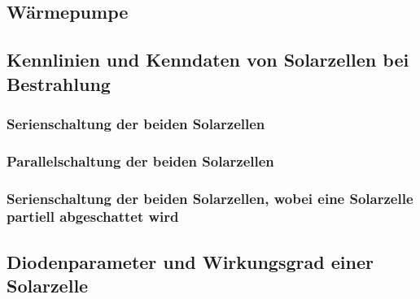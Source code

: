 \documentclass[12pt,english,ngerman]{scrartcl}
\begin{document}
\subsection{Wärmepumpe}

\subsection{Kennlinien und Kenndaten von Solarzellen bei Bestrahlung}

\subsubsection{Serienschaltung der beiden Solarzellen}

\subsubsection{Parallelschaltung der beiden Solarzellen}


\subsubsection{Serienschaltung der beiden Solarzellen, wobei eine Solarzelle partiell abgeschattet wird}

\subsection{Diodenparameter und Wirkungsgrad einer Solarzelle}


\listoffigures
\listoftables
\end{document}
